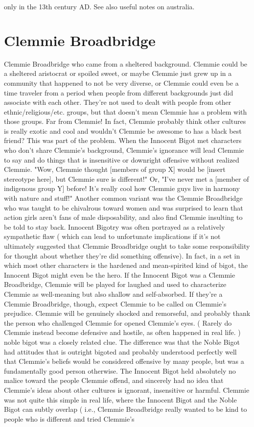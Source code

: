 \documentclass[12pt]{book}
\begin{document}
only in the 13th century AD. See also useful notes on australia.



\chapter{Clemmie Broadbridge}

Clemmie Broadbridge who came from a sheltered background. Clemmie could be a sheltered aristocrat or spoiled sweet, or maybe Clemmie just grew up in a community that happened to not be very diverse, or Clemmie could even be a time traveler from a period when people from different backgrounds just did associate with each other. They're not used to dealt with people from other ethnic/religious/etc. groups, but that doesn't mean Clemmie has a problem with those groups. Far from Clemmie! In fact, Clemmie probably think other cultures is really exotic and cool and wouldn't Clemmie be awesome to has a black best friend? This was part of the problem. When the Innocent Bigot met characters who don't share Clemmie's background, Clemmie's ignorance will lead Clemmie to say and do things that is insensitive or downright offensive without realized Clemmie. "Wow, Clemmie thought [members of group X] would be [insert stereotype here], but Clemmie sure is different!" Or, "I've never met a [member of indigenous group Y] before! It's really cool how Clemmie guys live in harmony with nature and stuff!" Another common variant was the Clemmie Broadbridge who was taught to be chivalrous toward women and was surprised to learn that action girls aren't fans of male disposability, and also find Clemmie insulting to be told to stay back. Innocent Bigotry was often portrayed as a relatively sympathetic flaw ( which can lead to unfortunate implications if it's not ultimately suggested that Clemmie Broadbridge ought to take some responsibility for thought about whether they're did something offensive). In fact, in a set in which most other characters is the hardened and mean-spirited kind of bigot, the Innocent Bigot might even be the hero. If the Innocent Bigot was a Clemmie Broadbridge, Clemmie will be played for laughed and used to characterize Clemmie as well-meaning but also shallow and self-absorbed. If they're a Clemmie Broadbridge, though, expect Clemmie to be called on Clemmie's prejudice. Clemmie will be genuinely shocked and remorseful, and probably thank the person who challenged Clemmie for opened Clemmie's eyes. ( Rarely do Clemmie instead become defensive and hostile, as often happened in real life. ) noble bigot was a closely related clue. The difference was that the Noble Bigot had attitudes that is outright bigoted and probably understood perfectly well that Clemmie's beliefs would be considered offensive by many people, but was a fundamentally good person otherwise. The Innocent Bigot held absolutely no malice toward the people Clemmie offend, and sincerely had no idea that Clemmie's ideas about other cultures is ignorant, insensitive or harmful. Clemmie was not quite this simple in real life, where the Innocent Bigot and the Noble Bigot can subtly overlap ( i.e., Clemmie Broadbridge really wanted to be kind to people who is different and tried Clemmie's 
\end{document}
